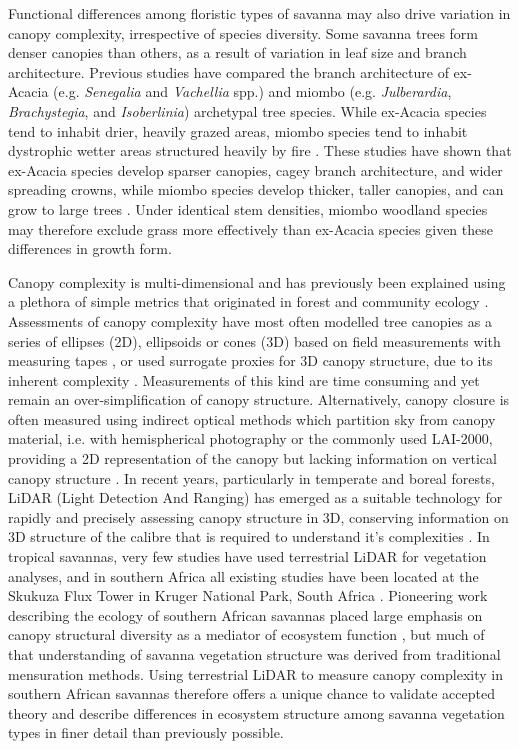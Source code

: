 \documentclass[11pt,a4paper]{article}
\begin{document}
Functional differences among floristic types of savanna may also drive variation in canopy complexity, irrespective of species diversity. Some savanna trees form denser canopies than others, as a result of variation in leaf size and branch architecture. Previous studies have compared the branch architecture of ex-Acacia (e.g. \textit{Senegalia} and \textit{Vachellia} spp.) and miombo (e.g. \textit{Julberardia}, \textit{Brachystegia}, and \textit{Isoberlinia}) archetypal tree species. While ex-Acacia species tend to inhabit drier, heavily grazed areas, miombo species tend to inhabit dystrophic wetter areas structured heavily by fire \citep{Ribeiro2020}. These studies have shown that ex-Acacia species develop sparser canopies, cagey branch architecture, and wider spreading crowns, while miombo species develop thicker, taller canopies, and can grow to large trees \citep{Mugasha2013, Archibald2003, Privette2004}. Under identical stem densities, miombo woodland species may therefore exclude grass more effectively than ex-Acacia species given these differences in growth form. 

Canopy complexity is multi-dimensional and has previously been explained using a plethora of simple metrics that originated in forest and community ecology \citep{Kershaw2017}. Assessments of canopy complexity have most often modelled tree canopies as a series of ellipses (2D), ellipsoids or cones (3D) based on field measurements with measuring tapes \citep{Jucker2015}, or used surrogate proxies for 3D canopy structure, due to its inherent complexity \citep{Seidel2011}. Measurements of this kind are time consuming and yet remain an over-simplification of canopy structure. Alternatively, canopy closure is often measured using indirect optical methods which partition sky from canopy material, i.e. with hemispherical photography or the commonly used LAI-2000, providing a 2D representation of the canopy but lacking information on vertical canopy structure \citep{Jonckheere2004}. In recent years, particularly in temperate and boreal forests, LiDAR (Light Detection And Ranging) has emerged as a suitable technology for rapidly and precisely assessing canopy structure in 3D, conserving information on 3D structure of the calibre that is required to understand it's complexities \citep{Muir2018, Calders2020}. In tropical savannas, very few studies have used terrestrial LiDAR for vegetation analyses, and in southern Africa all existing studies have been located at the Skukuza Flux Tower in Kruger National Park, South Africa \citep{Muumbe2021}. Pioneering work describing the ecology of southern African savannas placed large emphasis on canopy structural diversity as a mediator of ecosystem function \citep{Solbrig1996}, but much of that understanding of savanna vegetation structure was derived from traditional mensuration methods. Using terrestrial LiDAR to measure canopy complexity in southern African savannas therefore offers a unique chance to validate accepted theory and describe differences in ecosystem structure among savanna vegetation types in finer detail than previously possible.
\end{document}

